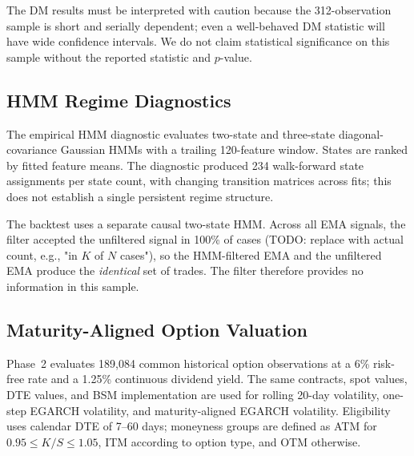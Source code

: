 \documentclass[journal]{IEEEtran}
\begin{document}
The DM results must be interpreted with caution because the 312-observation sample is short and serially dependent; even a well-behaved DM statistic will have wide confidence intervals. We do not claim statistical significance on this sample without the reported statistic and $p$-value.

\subsection{HMM Regime Diagnostics}

The empirical HMM diagnostic evaluates two-state and three-state diagonal-covariance Gaussian HMMs with a trailing 120-feature window. States are ranked by fitted feature means. The diagnostic produced 234 walk-forward state assignments per state count, with changing transition matrices across fits; this does not establish a single persistent regime structure.

%
%
The backtest uses a separate causal two-state HMM. Across all EMA signals, the filter accepted the unfiltered signal in 100\% of cases (TODO: replace with actual count, e.g., "in $K$ of $N$ cases"), so the HMM-filtered EMA and the unfiltered EMA produce the \emph{identical} set of trades. The filter therefore provides no information in this sample.

\subsection{Maturity-Aligned Option Valuation}

Phase~2 evaluates 189{,}084 common historical option observations at a 6\% risk-free rate and a 1.25\% continuous dividend yield. The same contracts, spot values, DTE values, and BSM implementation are used for rolling 20-day volatility, one-step EGARCH volatility, and maturity-aligned EGARCH volatility. Eligibility uses calendar DTE of 7--60 days; moneyness groups are defined as ATM for $0.95\le K/S\le1.05$, ITM according to option type, and OTM otherwise.
\end{document}
